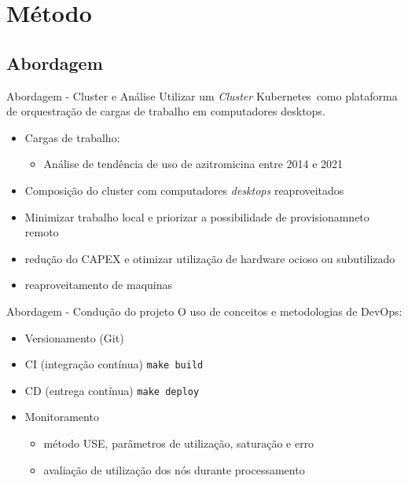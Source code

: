 \documentclass[10pt,brazil]{beamer}
\theoremstyle{definition}
\begin{document}
\section{Método}

\subsection{Abordagem}
\begin{frame}{Abordagem - Cluster e Análise}
  Utilizar um \emph{Cluster} Kubernetes\textregistered\ como plataforma de orquestração de cargas de trabalho em computadores desktops.
  \begin{itemize}
    \item Cargas de trabalho:
          \begin{itemize}
            \item Análise de tendência de uso de azitromicina entre 2014 e 2021
          \end{itemize}
        \item Composição do cluster com computadores \emph{desktops} reaproveitados
        \item Minimizar trabalho local e priorizar a possibilidade de provisionamneto remoto
        \item redução do CAPEX e otimizar utilização de hardware ocioso ou subutilizado
        \item reaproveitamento de maquinas
    \end{itemize}
\end{frame}

\begin{frame}{Abordagem - Condução do projeto}
  O uso de conceitos e metodologias de DevOps:
  \begin{itemize}
            \item Versionamento (Git) 
            \item CI (integração contínua) \texttt{make build}
            \item CD (entrega contínua) \texttt{make deploy}
    \item Monitoramento
        \begin{itemize}
            \item método USE, parâmetros de utilização, saturação e erro 
            \item avaliação de utilização dos nós durante processamento
        \end{itemize}
  \end{itemize}
\end{frame}
\end{document}
